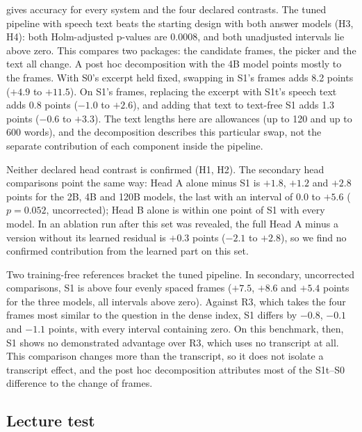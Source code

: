  gives accuracy for every system and the four declared contrasts.
The tuned pipeline with speech text beats the starting design with both answer models (H3, H4): both Holm-adjusted p-values are 0.0008, and both unadjusted intervals lie above zero.
This compares two packages: the candidate frames, the picker and the text all change.
A post hoc decomposition with the 4B model points mostly to the frames.
With S0's excerpt held fixed, swapping in S1's frames adds 8.2 points ($+4.9$ to $+11.5$).
On S1's frames, replacing the excerpt with S1t's speech text adds 0.8 points ($-1.0$ to $+2.6$), and adding that text to text-free S1 adds 1.3 points ($-0.6$ to $+3.3$).
The text lengths here are allowances (up to 120 and up to 600 words), and the decomposition describes this particular swap, not the separate contribution of each component inside the pipeline.

Neither declared head contrast is confirmed (H1, H2).
The secondary head comparisons point the same way: Head A alone minus S1 is $+1.8$, $+1.2$ and $+2.8$ points for the 2B, 4B and 120B models, the last with an interval of $0.0$ to $+5.6$ ($p{=}0.052$, uncorrected); Head B alone is within one point of S1 with every model.
In an ablation run after this set was revealed, the full Head A minus a version without its learned residual is $+0.3$ points ($-2.1$ to $+2.8$), so we find no confirmed contribution from the learned part on this set.

Two training-free references bracket the tuned pipeline.
In secondary, uncorrected comparisons, S1 is above four evenly spaced frames ($+7.5$, $+8.6$ and $+5.4$ points for the three models, all intervals above zero).
Against R3, which takes the four frames most similar to the question in the dense index, S1 differs by $-0.8$, $-0.1$ and $-1.1$ points, with every interval containing zero.
On this benchmark, then, S1 shows no demonstrated advantage over R3, which uses no transcript at all.
This comparison changes more than the transcript, so it does not isolate a transcript effect, and the post hoc decomposition attributes most of the S1t--S0 difference to the change of frames.

\subsection{Lecture test}
\label{sec:lectures}

